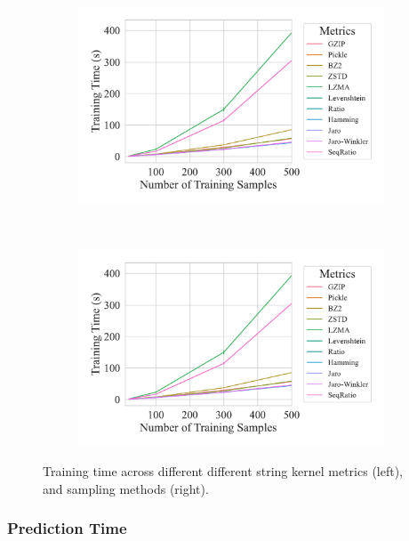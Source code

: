 \documentclass[sigconf]{acmart}
\begin{document}
\begin{figure}
	\begin{subfigure}
		\centering
		\includegraphics[width=.46\textwidth]{figs/truthseeker/metric_vs_train_time.pdf}
	\end{subfigure}
	~
	\begin{subfigure}
		\centering
		\includegraphics[width=.46\textwidth]{figs/truthseeker/metric_vs_train_time.pdf}
	\end{subfigure}
	\caption{Training time across different different string kernel metrics (left), and sampling methods (right).}
	\label{fig:training_time}
\end{figure}

\subsubsection{Prediction Time}
\end{document}
